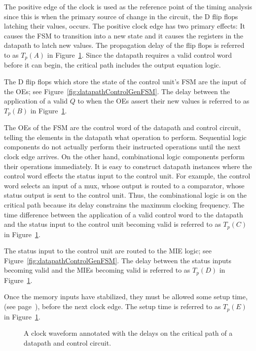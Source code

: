 The positive edge of the clock is used as the reference point
of the timing analysis since this is when the primary source of change
in the circuit, the D flip flops latching their values, occurs.
The positive clock edge has two primary effects: It causes the 
FSM to transition into a new state and it causes the registers in
the datapath to latch new values.  The propagation delay of the
flip flops is referred to as $T_p(A)$ in Figure~\ref{fig:datapathControlDPTime}.  Since
the datapath requires a valid control word before it can begin, 
the critical path includes the output equation logic. 

The D flip flops which store the state of the control unit's FSM
are the input of the OEs; see Figure~\ref{fig:datapathControlGenFSM}.  The delay
between the application of a valid $Q$ to when the OEs assert their new
values is referred to as $T_p(B)$ in Figure~\ref{fig:datapathControlDPTime}.

The OEs of the FSM are the control word of the datapath and
control circuit, telling the elements in the datapath what operation
to perform.  Sequential logic components do not actually
perform their instructed operations until the next clock edge
arrives.  On the other hand, combinational logic components 
perform their operations immediately.  It is easy to construct
datapath instances where the control word effects the status
input to the control unit.  For example, the control word
selects an input of a mux, whose output is routed to a comparator,
whose status output is sent to the control unit.  Thus, the 
combinational logic is on the critical path because its delay 
constrains the maximum clocking frequency.  The time difference 
between the application of a valid control word to the datapath
and the status input to the control unit becoming valid is referred 
to as $T_p(C)$ in Figure~\ref{fig:datapathControlDPTime}.

The status input to the control unit are routed to the MIE logic;
see Figure~\ref{fig:datapathControlGenFSM}.  The delay between the status inputs
becoming valid and the MIEs becoming valid is referred to as $T_p(D)$ 
in Figure~\ref{fig:datapathControlDPTime}.

Once the memory inputs have stabilized, they must be allowed
some setup time, (see page~\pageref{page:setup}), before the next
clock edge.  The setup time is referred to as $T_p(E)$ in 
Figure~\ref{fig:datapathControlDPTime}.

\begin{figure}[ht]
\caption{A clock waveform annotated with the delays on the
critical path of a datapath and control circuit.}
\label{fig:datapathControlDPTime}
\end{figure}

